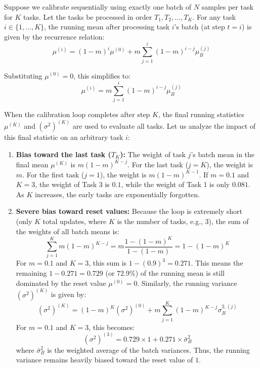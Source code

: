 \documentclass{article}
\theoremstyle{plain}
\theoremstyle{definition}
\theoremstyle{remark}
\begin{document}
Suppose we calibrate sequentially using exactly one batch of $N$ samples per task for $K$ tasks. Let the tasks be processed in order $T_1, T_2, \dots, T_K$. For any task $i \in \{1, \dots, K\}$, the running mean after processing task $i$'s batch (at step $t = i$) is given by the recurrence relation:
\begin{equation}
    \mu^{(i)} = (1 - m)^i \mu^{(0)} + m \sum_{j=1}^i (1 - m)^{i-j} \mu_B^{(j)}
\end{equation}

Substituting $\mu^{(0)} = 0$, this simplifies to:
\begin{equation}
    \mu^{(i)} = m \sum_{j=1}^i (1 - m)^{i-j} \mu_B^{(j)}
\end{equation}

When the calibration loop completes after step $K$, the final running statistics $\mu^{(K)}$ and $(\sigma^2)^{(K)}$ are used to evaluate all tasks. Let us analyze the impact of this final statistic on an arbitrary task $i$:
\begin{enumerate}
    \item \textbf{Bias toward the last task ($T_K$):} The weight of task $j$'s batch mean in the final mean $\mu^{(K)}$ is $m(1-m)^{K-j}$. For the last task ($j=K$), the weight is $m$. For the first task ($j=1$), the weight is $m(1-m)^{K-1}$. If $m = 0.1$ and $K = 3$, the weight of Task 3 is $0.1$, while the weight of Task 1 is only $0.081$. As $K$ increases, the early tasks are exponentially forgotten.
    \item \textbf{Severe bias toward reset values:} Because the loop is extremely short (only $K$ total updates, where $K$ is the number of tasks, e.g., 3), the sum of the weights of all batch means is:
    \begin{equation}
        \sum_{j=1}^K m(1-m)^{K-j} = m \frac{1 - (1-m)^K}{1 - (1-m)} = 1 - (1-m)^K
    \end{equation}
    For $m = 0.1$ and $K = 3$, this sum is $1 - (0.9)^3 = 0.271$.
    This means the remaining $1 - 0.271 = 0.729$ (or $72.9\%$) of the running mean is still dominated by the reset value $\mu^{(0)} = 0$.
    Similarly, the running variance $(\sigma^2)^{(K)}$ is given by:
    \begin{equation}
        (\sigma^2)^{(K)} = (1-m)^K (\sigma^2)^{(0)} + m \sum_{j=1}^K (1-m)^{K-j} \sigma_B^{2,(j)}
    \end{equation}
    For $m = 0.1$ and $K = 3$, this becomes:
    \begin{equation}
        (\sigma^2)^{(3)} = 0.729 \times 1 + 0.271 \times \bar{\sigma}_B^2
    \end{equation}
    where $\bar{\sigma}_B^2$ is the weighted average of the batch variances. Thus, the running variance remains heavily biased toward the reset value of $1$.
\end{enumerate}
\end{document}
